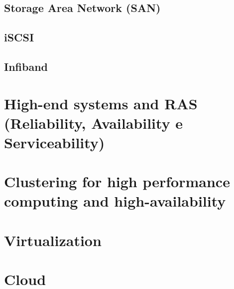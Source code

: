 \documentclass[8pt,a4paper]{article}
\begin{document}
\begin{multicols*}{4}
		\subsection{Storage Area Network (SAN)}
		\subsection{iSCSI}	
		\subsection{Infiband}	
	

	\section{High-end systems and RAS (Reliability, Availability e Serviceability)}
	
	\section{Clustering for high performance computing and high-availability}
	
	\section{Virtualization}
	
	\section{Cloud}
\end{multicols*}
\end{document}
